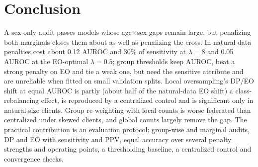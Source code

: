 \section{Conclusion}
A sex-only audit passes models whose age$\times$sex gaps remain large, but penalizing both marginals closes them about as well as penalizing the cross. In natural data penalties cost about 0.12 AUROC and 30\% of sensitivity at $\lambda{=}8$ and 0.05 AUROC at the EO-optimal $\lambda{=}0.5$; group thresholds keep AUROC, beat a strong penalty on EO and tie a weak one, but need the sensitive attribute and are unreliable when fitted on small validation splits. Local oversampling's DP/EO shift at equal AUROC is partly (about half of the natural-data EO shift) a class-rebalancing effect, is reproduced by a centralized control and is significant only in natural-size clients. Group re-weighting with local counts is worse federated than centralized under skewed clients, and global counts largely remove the gap. The practical contribution is an evaluation protocol: group-wise and marginal audits, DP and EO with sensitivity and PPV, equal accuracy over several penalty strengths and operating points, a thresholding baseline, a centralized control and convergence checks.

